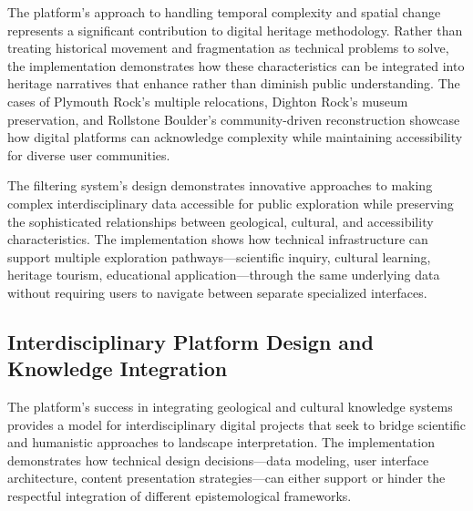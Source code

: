 The platform's approach to handling temporal complexity and spatial change represents a significant contribution to digital heritage methodology. Rather than treating historical movement and fragmentation as technical problems to solve, the implementation demonstrates how these characteristics can be integrated into heritage narratives that enhance rather than diminish public understanding. The cases of Plymouth Rock's multiple relocations, Dighton Rock's museum preservation, and Rollstone Boulder's community-driven reconstruction showcase how digital platforms can acknowledge complexity while maintaining accessibility for diverse user communities.


The filtering system's design demonstrates innovative approaches to making complex interdisciplinary data accessible for public exploration while preserving the sophisticated relationships between geological, cultural, and accessibility characteristics. The implementation shows how technical infrastructure can support multiple exploration pathways—scientific inquiry, cultural learning, heritage tourism, educational application—through the same underlying data without requiring users to navigate between separate specialized interfaces.

\subsection{Interdisciplinary Platform Design and Knowledge Integration}
\label{subsec:interdisciplinary_design}

The platform's success in integrating geological and cultural knowledge systems provides a model for interdisciplinary digital projects that seek to bridge scientific and humanistic approaches to landscape interpretation. The implementation demonstrates how technical design decisions—data modeling, user interface architecture, content presentation strategies—can either support or hinder the respectful integration of different epistemological frameworks.


